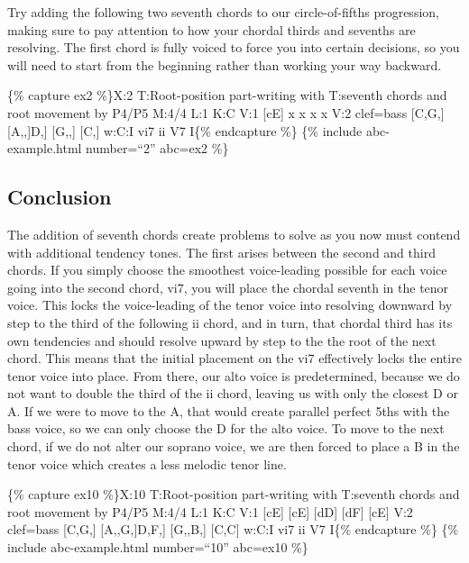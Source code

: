 \documentclass{book}
\begin{document}
Try adding the following two seventh chords to our circle-of-fifths
progression, making sure to pay attention to how your chordal thirds and
sevenths are resolving. The first chord is fully voiced to force you into
certain decisions, so you will need to start from the beginning rather than
working your way backward.

\{\% capture ex2 \%\}X:2 T:Root-position part-writing with T:seventh chords
and root movement by P4/P5 M:4/4 L:1 K:C V:1 {[}cE{]}\textbar{} x\textbar{}
x\textbar{} x\textbar{} x\textbar{]} V:2 clef=bass {[}C,G,{]}\textbar{}
{[}A,,{]}\textbar{[}D,{]}\textbar{} {[}G,,{]}\textbar{} {[}C,{]}\textbar{]}
w:C:I vi7 ii V7 I\{\% endcapture \%\} \{\% include abc-example.html
number=``2'' abc=ex2 \%\}

\hypertarget{conclusion-19}{%
\subsection{Conclusion}\label{conclusion-19}}

The addition of seventh chords create problems to solve as you now must
contend with additional tendency tones. The first arises between the second
and third chords. If you simply choose the smoothest voice-leading possible
for each voice going into the second chord, vi7, you will place the chordal
seventh in the tenor voice. This locks the voice-leading of the tenor voice
into resolving downward by step to the third of the following ii chord, and in
turn, that chordal third has its own tendencies and should resolve upward by
step to the the root of the next chord. This means that the initial placement
on the vi7 effectively locks the entire tenor voice into place. From there,
our alto voice is predetermined, because we do not want to double the third of
the ii chord, leaving us with only the closest D or A. If we were to move to
the A, that would create parallel perfect 5ths with the bass voice, so we can
only choose the D for the alto voice. To move to the next chord, if we do not
alter our soprano voice, we are then forced to place a B in the tenor voice
which creates a less melodic tenor line.

\{\% capture ex10 \%\}X:10 T:Root-position part-writing with T:seventh chords
and root movement by P4/P5 M:4/4 L:1 K:C V:1 {[}cE{]}\textbar{}
{[}cE{]}\textbar{} {[}dD{]}\textbar{} {[}dF{]}\textbar{} {[}cE{]}\textbar{]}
V:2 clef=bass {[}C,G,{]}\textbar{} {[}A,,G,{]}\textbar{[}D,F,{]}\textbar{}
{[}G,,B,{]}\textbar{} {[}C,C{]}\textbar{]} w:C:I vi7 ii V7 I\{\% endcapture
\%\} \{\% include abc-example.html number=``10'' abc=ex10 \%\}
\end{document}
